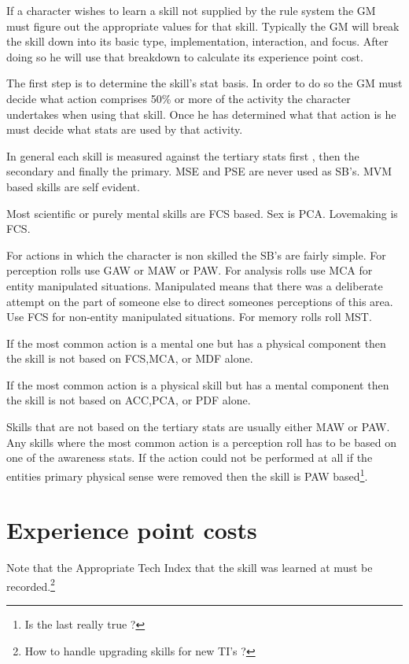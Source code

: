 \normalsize

If a character wishes to learn a skill not supplied by the rule
system the GM must figure out the appropriate values for that skill.
Typically the GM will break the skill down into its basic type,
implementation, interaction, and focus. After doing so he will use
that breakdown to calculate its experience point cost.

The first step is to determine the skill's stat basis. In order to do
so the GM must decide what action comprises 50\% or more of the activity
the character undertakes when using that skill. Once he has determined
what that action is he must decide what stats are used by that activity.

In general each skill is measured against the tertiary stats first , then the
secondary and finally the primary. MSE and PSE are never used as SB's.
MVM based skills are self evident.

Most scientific or purely mental skills are FCS based.
Sex is PCA. Lovemaking is FCS.

For actions in which the character is non skilled the SB's are fairly
simple. For perception rolls use GAW or MAW or PAW. For analysis rolls
use MCA for entity manipulated situations. Manipulated means that there
was a deliberate attempt on the part of someone else to direct someones
perceptions of this area. Use FCS for non-entity manipulated
situations. For memory rolls roll MST.

If the most common action is a mental one but has a physical component then
the skill is not based on FCS,MCA, or MDF alone.

If the most common action is a physical skill but has a mental component then the
skill is not based on ACC,PCA, or PDF alone.

Skills that are not based on the tertiary stats are usually either MAW
or PAW. Any skills where the most common action is a perception roll has
to be based on one of the awareness stats. If the action could not be
performed at all if the entities primary physical sense were removed
then the skill is PAW based\footnote{Is the last really true ?}.

\section{Experience point costs}

Note that the Appropriate Tech Index that the skill was learned at
must be recorded.\footnote{ How to handle upgrading skills for new TI's ?}

